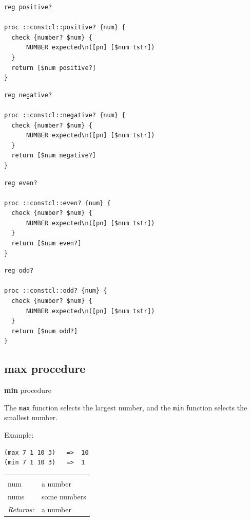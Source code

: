 \documentclass[a5paper,draft]{memoir}
\begin{document}
\begin{lstlisting}
reg positive?

proc ::constcl::positive? {num} {
  check {number? $num} {
      NUMBER expected\n([pn] [$num tstr])
  }
  return [$num positive?]
}
\end{lstlisting}

\begin{lstlisting}
reg negative?

proc ::constcl::negative? {num} {
  check {number? $num} {
      NUMBER expected\n([pn] [$num tstr])
  }
  return [$num negative?]
}
\end{lstlisting}

\begin{lstlisting}
reg even?

proc ::constcl::even? {num} {
  check {number? $num} {
      NUMBER expected\n([pn] [$num tstr])
  }
  return [$num even?]
}
\end{lstlisting}

\begin{lstlisting}
reg odd?

proc ::constcl::odd? {num} {
  check {number? $num} {
      NUMBER expected\n([pn] [$num tstr])
  }
  return [$num odd?]
}
\end{lstlisting}

\subsection{max procedure}
\label{max-procedure}

\textbf{min} procedure

The \texttt{max} function selects the largest number, and the \texttt{min} function selects the smallest number.

Example:

\begin{verbatim}
(max 7 1 10 3)   =>  10
(min 7 1 10 3)   =>  1
\end{verbatim}

\noindent\begin{tabular}{ |p{1.9cm} p{6.5cm}| }
\hline
\rowcolor[HTML]{CCCCCC} \multicolumn{2}{|l|}{\textbf{max, min (public)}} \\
num & a number \\
nums & some numbers \\
\textit{Returns:} & a number \\
\hline
\end{tabular}
\end{document}
